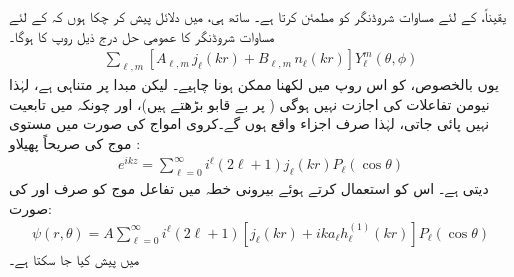 یقیناً،   کے لئے مساوات شروڈنگر کو  مطمئن کرتا ہے۔ ساتھ ہی،  میں دلائل پیش کر چکا ہوں کہ  کے لئے مساوات شروڈنگر کا عمومی حل درج ذیل روپ کا ہوگا۔
\begin{align*}
	\sum_{\ell, m}\left[A_{\ell, m}\,j_{\ell}(kr)+B_{\ell, m}\,n_{\ell}(kr)\right]Y_{\ell}^m(\theta, \phi)
\end{align*}
یوں بالخصوص،   کو اس  روپ میں لکھنا  ممکن ہونا چاہیے۔  لیکن  مبدا پر  متناہی ہے،  لہٰذا نیومن تفاعلات کی اجازت نہیں ہوگی  ( پر  بے قابو بڑھتے ہیں)،  اور چونکہ  میں تابعیت      نہیں پائی  جاتی،  لہٰذا صرف  اجزاء واقع  ہوں گے۔کروی امواج کی صورت میں مستوی موج کی  صریحاً پھیلاو :
\begin{align}\label{مساوات_بکھراو_کلیہ_ریلے}
	e^{ikz} = \sum_{\ell=0}^{\infty}i^{\ell}(2\ell+1)j_{\ell}(kr)P_{\ell}(\cos\theta)
\end{align}
 دیتی ہے۔ اس کو استعمال کرتے ہوئے بیرونی خطہ میں تفاعل موج کو صرف  اور  کی صورت:
\begin{align}
	\psi(r, \theta) = A\sum_{\ell=0}^{\infty}i^{\ell}(2\ell+1)\left[j_{\ell}(kr)+ika_{\ell}h_{\ell}^{(1)}(kr)\right]P_{\ell}(\cos\theta)
\end{align}
 میں پیش کیا جا سکتا ہے۔

